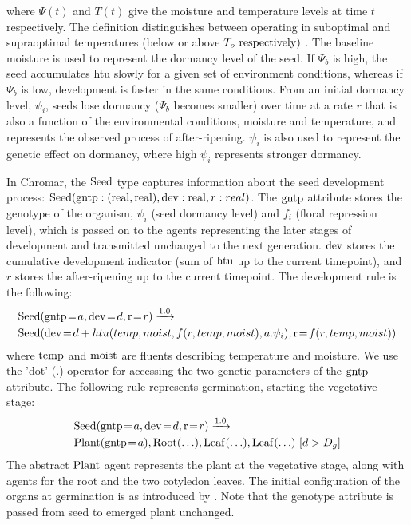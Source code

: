 where \(\Psi(t)\) and \(T(t)\) give the moisture and temperature levels
at time \(t\) respectively. The definition distinguishes between
operating in suboptimal and supraoptimal temperatures (below or above
\(T_{o}\ \mathrm{respectively})\ \). The baseline moisture is used to
represent the dormancy level of the seed. If \(\Psi_{b}\) is high, the
seed accumulates htu slowly for a given set of environment conditions,
whereas if \(\Psi_{b}\) is low, development is faster in the same
conditions. From an initial dormancy level, \(\psi_{i}\), seeds lose
dormancy (\(\Psi_{b}\) becomes smaller) over time at a rate $r$
that is also a function of the environmental conditions, moisture and
temperature, and represents the observed process of after-ripening.
\(\psi_{i}\) is also used to represent the genetic effect on dormancy,
where high \(\psi_{i}\) represents stronger dormancy.

In Chromar, the \(\mathrm{Seed}\) type captures information about the seed
development process:
\(\mathrm{Seed}(\mathrm{gntp}:(\mathrm{real},\mathrm{real}),\mathrm{dev}:\mathrm{real},r:real)\).  The
\(\mathrm{gntp}\) attribute stores the genotype of the organism, \(\psi_{i}\) (seed
dormancy level) and \(f_{i}\) (floral repression level), which is passed on to
the agents representing the later stages of development and transmitted
unchanged to the next generation.  \(\mathrm{dev}\) stores the cumulative
development indicator (sum of \(\mathrm{htu}\) up to the current timepoint), and
\(r\) stores the after-ripening up to the current timepoint. The development
rule is the following:
\begin{equation*}
\begin{split}
& \mr{Seed}(\ar{gntp}{a}, \ar{dev}{d}, \ar{r}{r}) \xrightarrow{1.0} \\ 
&\mr{Seed}(\ar{dev}{d + htu(temp, moist, f(r,temp,moist), a.\psi_i)}, 
\ar{r}{f(r, temp, moist)})
\end{split}
\end{equation*}
where \(\mathrm{temp}\) and \(\mathrm{moist}\) are fluents describing
temperature and moisture. We use the 'dot' (\(.\)) operator for
accessing the two genetic parameters of the \(\mathrm{gntp}\) attribute.
The following rule represents germination, starting the vegetative
stage:
\begin{equation*}
\begin{split}
& \mr{Seed}(\ar{gntp}{a},\ar{dev}{d},\ar{r}{r} ) \xrightarrow{1.0} \\
& \mr{Plant}(\ar{gntp}{a}), \mr{Root}(\ldots),\mr{Leaf}( \ldots ), \mr{Leaf}(\ldots) \, \, \lbrack d > D_{g}\rbrack
\end{split}
\end{equation*}
The abstract \(\mathrm{Plant}\) agent represents the plant at the vegetative stage,
along with agents for the root and the two cotyledon leaves. The initial
configuration of the organs at germination is as introduced by
\citet{chew_multiscale_2014}. Note that the genotype attribute is passed from
seed to emerged plant unchanged.


